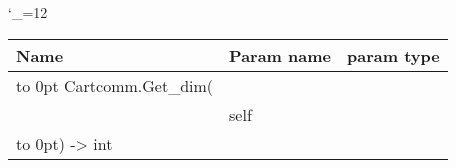 \begingroup \catcode`\_=12 \tt
\begin{tabular}{lll}
\toprule
\textrm{Name}&\textrm{Param name}&\textrm{param type}\\
\midrule
\hbox to 0pt {Cartcomm.Get_dim(\hss}\\
& self\\
\hbox to 0pt{) -> int\hss}\\
\bottomrule
\end{tabular}
\endgroup
